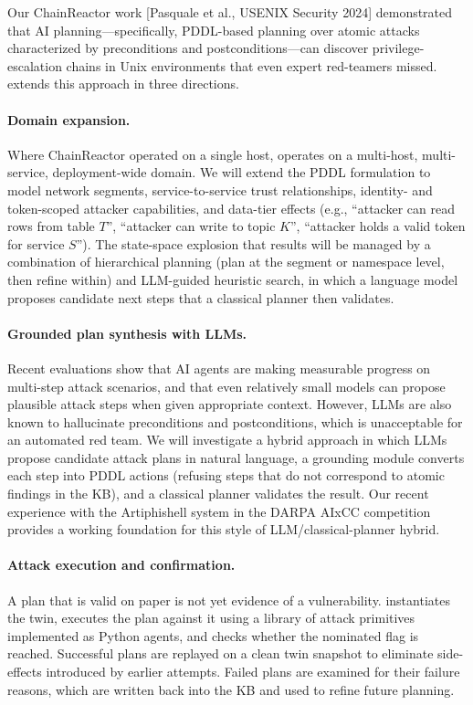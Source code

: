 Our ChainReactor work [Pasquale et al., USENIX Security 2024] demonstrated that AI
planning---specifically, PDDL-based planning over atomic attacks
characterized by preconditions and postconditions---can discover
privilege-escalation chains in Unix environments that even expert
red-teamers missed. \sysname extends this approach in three directions.

\paragraph{Domain expansion.}
Where ChainReactor operated on a single host, \sysname operates on a
multi-host, multi-service, deployment-wide domain. We will extend the
PDDL formulation to model network segments, service-to-service trust
relationships, identity- and token-scoped attacker capabilities, and
data-tier effects (e.g., ``attacker can read rows from table $T$'',
``attacker can write to topic $K$'', ``attacker holds a valid token
for service $S$''). The state-space explosion that results will be
managed by a combination of hierarchical planning (plan at the
segment or namespace level, then refine within) and LLM-guided
heuristic search, in which a language model proposes candidate next
steps that a classical planner then validates.

\paragraph{Grounded plan synthesis with LLMs.}
Recent evaluations show that AI agents are making measurable progress
on multi-step attack scenarios, and that even relatively small models
can propose plausible attack steps when given appropriate context.
However, LLMs are also known to hallucinate preconditions and
postconditions, which is unacceptable for an automated red team. We
will investigate a hybrid approach in which LLMs propose candidate
attack plans in natural language, a grounding module converts each
step into PDDL actions (refusing steps that do not correspond to
atomic findings in the KB), and a classical planner validates the
result. Our recent experience with the Artiphishell system in the
DARPA AIxCC competition provides a working foundation for this style
of LLM/classical-planner hybrid.

\paragraph{Attack execution and confirmation.}
A plan that is valid on paper is not yet evidence of a vulnerability.
\sysname instantiates the twin, executes the plan against it using a
library of attack primitives implemented as Python agents, and checks
whether the nominated flag is reached. Successful plans are replayed
on a clean twin snapshot to eliminate side-effects introduced by
earlier attempts. Failed plans are examined for their failure reasons,
which are written back into the KB and used to refine future planning.

